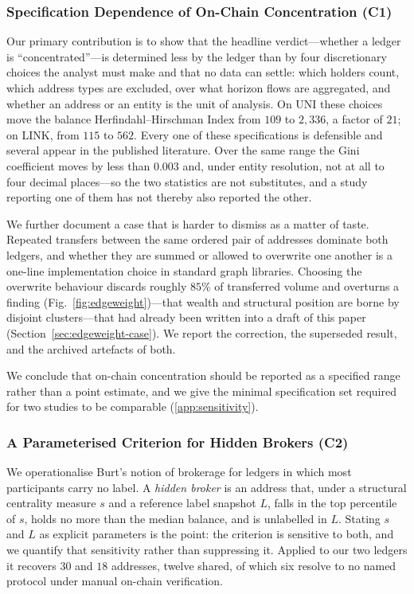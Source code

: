 \documentclass[final,5p,times]{elsarticle}
\begin{document}
\subsubsection{Specification Dependence of On-Chain Concentration (C1)}
\label{sec:contrib-spec}
Our primary contribution is to show that the headline verdict---whether a
ledger is ``concentrated''---is determined less by the ledger than by four
discretionary choices the analyst must make and that no data can settle:
which holders count, which address types are excluded, over what horizon
flows are aggregated, and whether an address or an entity is the unit of
analysis. On UNI these choices move the balance Herfindahl--Hirschman Index
from $109$ to $2{,}336$, a factor of $21$; on LINK, from $115$ to $562$.
Every one of these specifications is defensible and several appear in the
published literature. Over the same range the Gini coefficient moves by less
than $0.003$ and, under entity resolution, not at all to four decimal
places---so the two statistics are not substitutes, and a study reporting
one of them has not thereby also reported the other.

We further document a case that is harder to dismiss as a matter of taste.
Repeated transfers between the same ordered pair of addresses dominate both
ledgers, and whether they are summed or allowed to overwrite one another is
a one-line implementation choice in standard graph libraries. Choosing the overwrite behaviour discards roughly $85\%$ of transferred
volume and overturns a finding (Fig.~\ref{fig:edgeweight})---that wealth and structural position are borne by disjoint
clusters---that had already been written into a draft of this paper
(Section~\ref{sec:edgeweight-case}). We report the correction, the
superseded result, and the archived artefacts of both.

We conclude that on-chain concentration should be reported as a specified
range rather than a point estimate, and we give the minimal specification
set required for two studies to be comparable
(\ref{app:sensitivity}).

\subsubsection{A Parameterised Criterion for Hidden Brokers (C2)}
We operationalise Burt's notion of brokerage \cite{burt1992structural} for
ledgers in which most participants carry no label. A \emph{hidden broker} is
an address that, under a structural centrality measure $s$ and a reference
label snapshot $L$, falls in the top percentile of $s$, holds no more than
the median balance, and is unlabelled in $L$. Stating $s$ and $L$ as explicit
parameters is the point: the criterion is sensitive to both, and we quantify
that sensitivity rather than suppressing it. Applied to our two ledgers it
recovers $30$ and $18$ addresses, twelve shared, of which six resolve to no
named protocol under manual on-chain verification.
\end{document}
